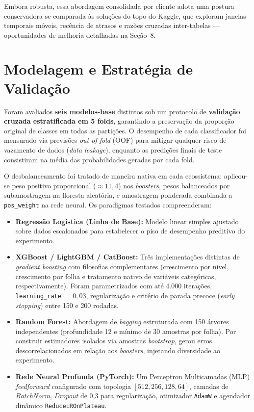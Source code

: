 \documentclass[10pt,a4paper]{article}
\begin{document}
Embora robusta, essa abordagem consolidada por cliente adota uma postura conservadora se comparada às soluções do topo do Kaggle, que exploram janelas temporais móveis, recência de atrasos e razões cruzadas inter-tabelas --- oportunidades de melhoria detalhadas na Seção~8.

\section{Modelagem e Estratégia de Validação}
Foram avaliados \textbf{seis modelos-base} distintos sob um protocolo de \textbf{validação cruzada estratificada em 5 folds}, garantindo a preservação da proporção original de classes em todas as partições. O desempenho de cada classificador foi mensurado via previsões \textit{out-of-fold} (OOF) para mitigar qualquer risco de vazamento de dados (\textit{data leakage}), enquanto as predições finais de teste consistiram na média das probabilidades geradas por cada fold.

O desbalanceamento foi tratado de maneira nativa em cada ecossistema: aplicou-se peso positivo proporcional ($\approx 11{,}4$) nos \textit{boosters}, pesos balanceados por subamostragem na floresta aleatória, e amostragem ponderada combinada a \texttt{pos\_weight} na rede neural. Os paradigmas testados compreenderam:
\begin{itemize}
    \item \textbf{Regressão Logística (Linha de Base):} Modelo linear simples ajustado sobre dados escalonados para estabelecer o piso de desempenho preditivo do experimento.
    \item \textbf{XGBoost / LightGBM / CatBoost:} Três implementações distintas de \textit{gradient boosting} com filosofias complementares (crescimento por nível, crescimento por folha e tratamento nativo de variáveis categóricas, respectivamente). Foram parametrizados com até 4.000 iterações, \texttt{learning\_rate} $=0{,}03$, regularização e critério de parada precoce (\textit{early stopping}) entre 150 e 200 rodadas.
    \item \textbf{Random Forest:} Abordagem de \textit{bagging} estruturada com 150 árvores independentes (profundidade 12 e mínimo de 30 amostras por folha). Por construir estimadores isolados via amostras \textit{bootstrap}, gerou erros descorrelacionados em relação aos \textit{boosters}, injetando diversidade ao experimento.
    \item \textbf{Rede Neural Profunda (PyTorch):} Um Perceptron Multicamadas (MLP) \textit{feedforward} configurado com topologia $[512, 256, 128, 64]$, camadas de \textit{BatchNorm}, \textit{Dropout} de 0,3 para regularização, otimizador \texttt{AdamW} e agendador dinâmico \texttt{ReduceLROnPlateau}.
\end{itemize}
\end{document}
